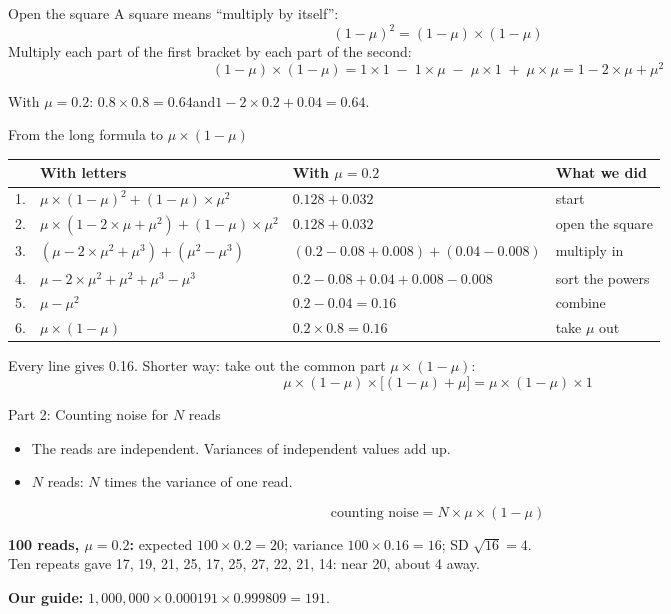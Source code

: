 \documentclass[aspectratio=169,11pt]{beamer}
\begin{document}
\begin{frame}{Open the square}
A square means ``multiply by itself'':
\[
(1-\mu)^2 = (1-\mu) \times (1-\mu)
\]
Multiply each part of the first bracket by each part of the second:
\[
(1-\mu) \times (1-\mu) = 1 \times 1 \;-\; 1 \times \mu \;-\; \mu \times 1
 \;+\; \mu \times \mu = 1 - 2 \times \mu + \mu^2
\]
\begin{worked}
With $\mu = 0.2$: $0.8 \times 0.8 = 0.64$\qquad and\qquad $1 - 2 \times 0.2 + 0.04 = 0.64$.
\end{worked}
\end{frame}

\begin{frame}{From the long formula to $\mu \times (1-\mu)$}
\footnotesize
\renewcommand{\arraystretch}{1.25}
\begin{tabular}{@{}r@{\;}l l l@{}}
\toprule
& With letters & With $\mu = 0.2$ & What we did\\
\midrule
1. & $\mu \times (1-\mu)^2 + (1-\mu) \times \mu^2$ & $0.128 + 0.032$ & start\\
2. & $\mu \times (1 - 2\times\mu + \mu^2) + (1-\mu) \times \mu^2$ & $0.128 + 0.032$ & open the square\\
3. & $(\mu - 2\times\mu^2 + \mu^3) + (\mu^2 - \mu^3)$ & $(0.2 - 0.08 + 0.008) + (0.04 - 0.008)$ & multiply in\\
4. & $\mu - 2\times\mu^2 + \mu^2 + \mu^3 - \mu^3$ & $0.2 - 0.08 + 0.04 + 0.008 - 0.008$ & sort the powers\\
5. & $\mu - \mu^2$ & $0.2 - 0.04 = 0.16$ & combine\\
6. & $\mu \times (1-\mu)$ & $0.2 \times 0.8 = 0.16$ & take $\mu$ out\\
\bottomrule
\end{tabular}
\medskip

\normalsize
Every line gives \alert{0.16}. Shorter way: take out the common part
$\mu \times (1-\mu)$:
\[
\mu \times (1-\mu) \times \bigl[(1-\mu) + \mu\bigr] = \mu \times (1-\mu) \times 1
\]
\end{frame}

\begin{frame}{Part 2: Counting noise for $N$ reads}
\begin{itemize}
\item The reads are independent. Variances of independent values
  \alert{add up}.
\item $N$ reads: $N$ times the variance of one read.
\end{itemize}
\[
\text{counting noise} = N \times \mu \times (1-\mu)
\]
\begin{worked}
\textbf{100 reads, $\mu = 0.2$:} expected $100 \times 0.2 = 20$; variance
$100 \times 0.16 = 16$; SD $\sqrt{16} = 4$.\\
Ten repeats gave 17, 19, 21, 25, 17, 25, 27, 22, 21, 14: near 20, about 4
away.

\textbf{Our guide:} $1{,}000{,}000 \times 0.000191 \times 0.999809 = 191$.
\end{worked}
\end{frame}
\end{document}
